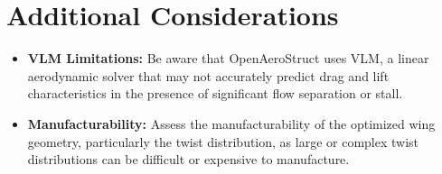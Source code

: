 \documentclass{article}
\begin{document}
\section{Additional Considerations}

\begin{itemize}
    \item \textbf{VLM Limitations:} Be aware that OpenAeroStruct uses VLM, a linear aerodynamic solver that may not accurately predict drag and lift characteristics in the presence of significant flow separation or stall.
    \item \textbf{Manufacturability:} Assess the manufacturability of the optimized wing geometry, particularly the twist distribution, as large or complex twist distributions can be difficult or expensive to manufacture.
\end{itemize}
\end{document}
